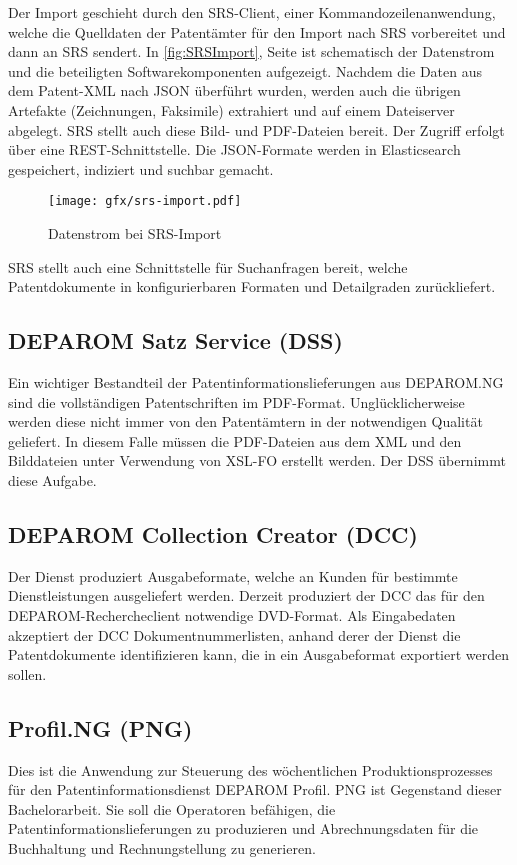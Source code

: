 Der Import geschieht durch den SRS-Client, einer Kommandozeilenanwendung, welche
die Quelldaten der Patentämter für den Import nach SRS vorbereitet und dann an
SRS sendert. In \autoref{fig:SRSImport}, Seite \pageref{fig:SRSImport} ist
schematisch  der Datenstrom und die beteiligten Softwarekomponenten aufgezeigt.
Nachdem die Daten aus dem Patent-XML nach JSON überführt wurden, werden auch die
übrigen Artefakte (Zeichnungen, Faksimile) extrahiert und auf einem Dateiserver
abgelegt. SRS stellt auch diese Bild- und PDF-Dateien bereit. Der Zugriff
erfolgt über eine REST-Schnittstelle. Die JSON-Formate werden in Elasticsearch
gespeichert, indiziert und suchbar gemacht.

\begin{figure}[h]
  \texttt{[image: gfx/srs-import.pdf]}
  \caption{Datenstrom bei SRS-Import}
  \label{fig:SRSImport}
\end{figure}

SRS stellt auch eine Schnittstelle für Suchanfragen bereit, welche
Patentdokumente in konfigurierbaren Formaten und Detailgraden zurückliefert.

\subsection{DEPAROM Satz Service (DSS)}
\label{ch:fachlichesUmfeld:Teilsysteme:DSS}

Ein wichtiger Bestandteil der Patentinformationslieferungen aus DEPAROM.NG sind
die vollständigen Patentschriften im PDF-Format. Unglücklicherweise werden diese
nicht immer von den Patentämtern in der notwendigen Qualität geliefert. In
diesem Falle müssen die PDF-Dateien aus dem XML und den Bilddateien unter
Verwendung von XSL-FO erstellt werden. Der DSS übernimmt diese Aufgabe.

\subsection{DEPAROM Collection Creator (DCC)}
\label{ch:fachlichesUmfeld:Teilsysteme:DCC}

Der Dienst produziert Ausgabeformate, welche an Kunden für bestimmte
Dienstleistungen ausgeliefert werden. Derzeit produziert der DCC das für den
DEPAROM-Rechercheclient notwendige DVD-Format. Als Eingabedaten akzeptiert der
DCC Dokumentnummerlisten, anhand derer der Dienst die Patentdokumente
identifizieren kann, die in ein Ausgabeformat exportiert werden sollen.

\subsection{Profil.NG (PNG)}
\label{ch:fachlichesUmfeld:Teilsysteme:PNG}

Dies ist die Anwendung zur Steuerung des wöchentlichen Produktionsprozesses für
den Patentinformationsdienst DEPAROM Profil. PNG ist Gegenstand dieser
Bachelorarbeit. Sie soll die Operatoren befähigen, die
Patentinformationslieferungen zu produzieren und Abrechnungsdaten für die
Buchhaltung und Rechnungstellung zu generieren.
